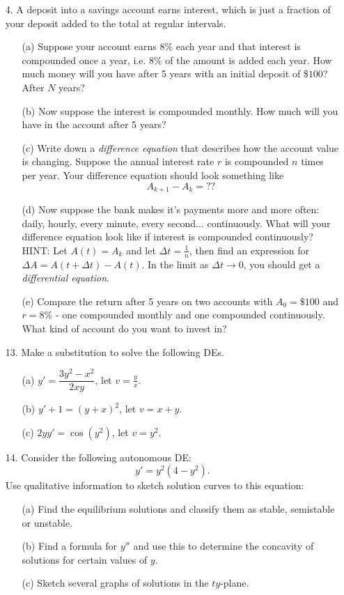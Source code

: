 \documentclass[12pt]{article}
\begin{document}
\begin{itemize}
\item[4.] A deposit into a savings account earns interest, which is just a fraction of your deposit added to the total at regular intervals.  
\begin{itemize}
\item[(a)] Suppose your account earns $8\%$ each year and that interest is compounded once a year, i.e. $8\%$ of the amount is added each year.  How much money will you have after 5 years with an initial deposit of \$$100$?   After $N$ years?
\item[(b)] Now suppose the interest is compounded monthly.  How much will you have in the account after 5 years?
\item[(c)] Write down a \textit{difference equation} that describes how the account value is changing.  Suppose the annual interest rate $r$ is compounded $n$ times per year.  Your difference equation should look something like
$$A_{k+1} - A_k = ??$$
\item[(d)] Now suppose the bank makes it's payments more and more often:  daily, hourly, every minute, every second... continuously.  What will your difference equation look like if interest is compounded continuously?  HINT: Let $A(t) = A_k$ and let $\Delta t = \frac{1}{n}$, then find an expression for $\Delta A = A(t+\Delta t) - A(t)$.  In the limit as $\Delta t \to 0$, you should get a \textit{differential equation}.
\item[(e)] Compare the return after 5 years on two accounts with $A_0 = \$100$ and $r = 8\%$ - one compounded monthly and one compounded continuously.  What kind of account do you want to invest in?
\end{itemize}





\item[13.] Make a substitution to solve the following DEs.  
\begin{itemize}
\item[(a)] $y' = \dfrac{3y^2-x^2}{2xy}$, let $v= \frac{y}{x}$.
\item[(b)] $y' + 1 = (y+x)^2$, let $v = x+y$.
\item[(c)] $2yy' = \cos(y^2)$, let $v = y^2$.
\end{itemize}


\item[14.] Consider the following autonomous DE:
$$ y' = y^2(4-y^2).$$
Use qualitative information to sketch solution curves to this equation:
\begin{itemize}
\item[(a)] Find the equilibrium solutions and classify them as stable, semistable or unstable.
\item[(b)] Find a formula for $y''$ and use this to determine the concavity of solutions for certain values of $y$.
\item[(c)] Sketch several graphs of solutions in the $ty$-plane.
\end{itemize}





\end{itemize}
\end{document}

